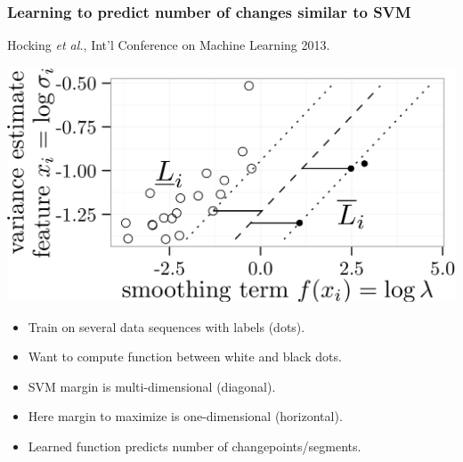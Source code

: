\documentclass{beamer}
\begin{document}
\begin{frame}
  \frametitle{Learning to predict number of changes similar to SVM}
  Hocking \emph{et al.}, Int'l Conference on Machine Learning 2013.

  \includegraphics[width=0.8\linewidth]{icml13-hard-margin}
  \begin{itemize}
  \item Train on several data sequences with labels (dots).
  \item Want to compute function between white and black dots.
  \item SVM margin is multi-dimensional (diagonal).
  \item Here margin to maximize is one-dimensional (horizontal).
  \item Learned function predicts number of changepoints/segments.
  \end{itemize}
\end{frame}

  


  
\end{document}

